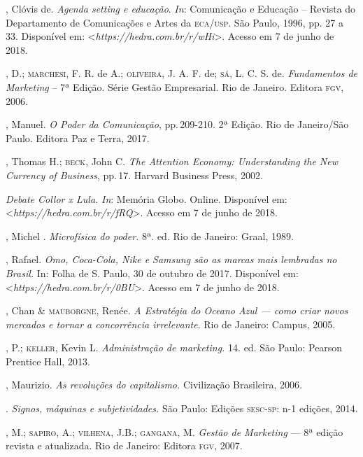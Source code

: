\begin{bibliohedra}

, Clóvis de. \emph{Agenda setting e educação}. \emph{In}:
Comunicação e Educação -- Revista do Departamento de Comunicações e
Artes da \textsc{eca}/\textsc{usp}. São Paulo, 1996, pp. 27 a 33. Disponível em:
\textless{}\emph{https://hedra.com.br/r/wHi}\textgreater{}. Acesso em 7 de junho de 2018.

, D.; \textsc{marchesi}, F. R. de A.; \textsc{oliveira}, J. A. F. de; \textsc{sá}, L. C. S. de. \emph{Fundamentos de Marketing} -- 7ª Edição. Série Gestão
Empresarial. Rio de Janeiro. Editora \textsc{fgv}, 2006.

, Manuel. \emph{O Poder da Comunicação}, pp.\,209-210. 2ª
Edição. Rio de Janeiro/São Paulo. Editora Paz e Terra, 2017.

, Thomas H.; \textsc{beck}, John C. \emph{The Attention Economy:
Understanding the New Currency of Business}, pp.\,17. Harvard Business
Press, 2002.

\emph{Debate Collor x Lula.} \emph{In}: Memória Globo. Online. Disponível em:
\textless{}\emph{https://hedra.com.br/r/fRQ}\textgreater{}. Acesso em 7 de junho de 2018.

, Michel . \emph{Microfísica do poder.} 8ª. ed. Rio de
Janeiro: Graal, 1989.

, Rafael. \emph{Omo, Coca-Cola, Nike e Samsung são as marcas
mais lembradas no Brasil.} In: Folha de S. Paulo, 30 de outubro de 2017.
Disponível em: \textless{}\emph{https://hedra.com.br/r/0BU}\textgreater{}. Acesso em 7 de junho de 2018.

, Chan \& \textsc{mauborgne}, Renée. \emph{A Estratégia do Oceano Azul ---
como criar novos mercados e tornar a concorrência irrelevante}. Rio de
Janeiro: Campus, 2005.

, P.; \textsc{keller}, Kevin L. \emph{Administração de marketing.} 14.
ed. São Paulo: Pearson Prentice Hall, 2013.

, Maurizio. \emph{As revoluções do capitalismo.} Civilização
Brasileira, 2006.

\titidem. \emph{Signos, máquinas e subjetividades.} São
Paulo: Edições \textsc{sesc-sp}: n-1 edições, 2014.

, M.; \textsc{sapiro}, A.; \textsc{vilhena}, J.B.; \textsc{gangana}, M. \emph{Gestão de Marketing} --- 8ª edição revista e atualizada. Rio de Janeiro: Editora
\textsc{fgv}, 2007.


\end{bibliohedra}
